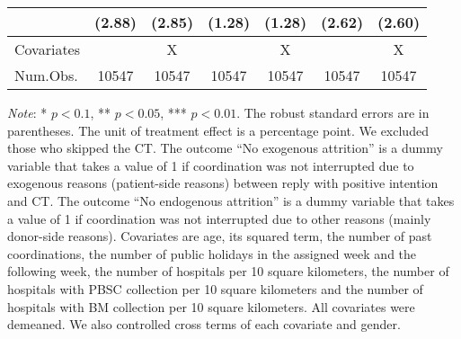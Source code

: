 \documentclass[12pt, a4paper]{article}
\begin{document}
\begin{table}
\begin{threeparttable}
\begin{tabular}[t]{lcccccc}
 & (\num{2.88}) & (\num{2.85}) & (\num{1.28}) & (\num{1.28}) & (\num{2.62}) & (\num{2.60})\\
\midrule
Covariates &  & X &  & X &  & X\\
Num.Obs. & \num{10547} & \num{10547} & \num{10547} & \num{10547} & \num{10547} & \num{10547}\\
\bottomrule
\end{tabular}
\begin{tablenotes}
\item \emph{Note}: * $p < 0.1$, ** $p < 0.05$, *** $p < 0.01$. The robust standard errors are in parentheses. The unit of treatment effect is a percentage point. We excluded those who skipped the CT. The outcome ``No exogenous attrition'' is a dummy variable that takes a value of 1 if coordination was not interrupted due to exogenous reasons (patient-side reasons) between reply with positive intention and CT. The outcome ``No endogenous attrition'' is a dummy variable that takes a value of 1 if coordination was not interrupted due to other reasons (mainly donor-side reasons). Covariates are age, its squared term, the number of past coordinations, the number of public holidays in the assigned week and the following week, the number of hospitals per 10 square kilometers, the number of hospitals with PBSC collection per 10 square kilometers and the number of hospitals with BM collection per 10 square kilometers. All covariates were demeaned. We also controlled cross terms of each covariate and gender.
\end{tablenotes}
\end{threeparttable}
\end{table}
\end{document}
